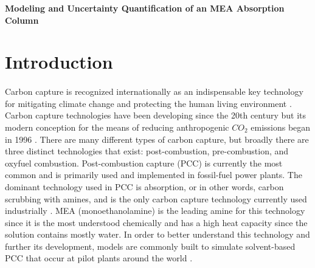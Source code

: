 \documentclass[12pt, letterpaper]{article}
\begin{document}
\begin{titlepage}
   \begin{center}
       \vspace*{1cm}

       \textbf{Modeling and Uncertainty Quantification of an MEA Absorption Column}
             
   \end{center}
\end{titlepage}

\newpage
  \tableofcontents
\newpage

\section{Introduction}

\paragraph{}
Carbon capture is recognized internationally as an indispensable key technology for mitigating climate change and protecting the human living environment \cite{Ma2022}. Carbon capture technologies have been developing since the 20th century but its modern conception for the means of reducing anthropogenic $CO_2$ emissions began in 1996 \cite{Ma2022}. There are many different types of carbon capture, but broadly there are three distinct technologies that exist: post-combustion, pre-combustion, and oxyfuel combustion. Post-combustion capture (PCC) is currently the most common and is primarily used and implemented in fossil-fuel power plants. The dominant technology used in PCC is absorption, or in other words, carbon scrubbing with amines, and is the only carbon capture technology currently used industrially \cite{CarbonCaptureTechs}. MEA (monoethanolamine) is the leading amine for this technology since it is the most understood chemically and has a high heat capacity since the solution contains mostly water. In order to better understand this technology and further its development, models are commonly built to simulate solvent-based PCC that occur at pilot plants around the world \cite{Oko2017}.
\end{document}

